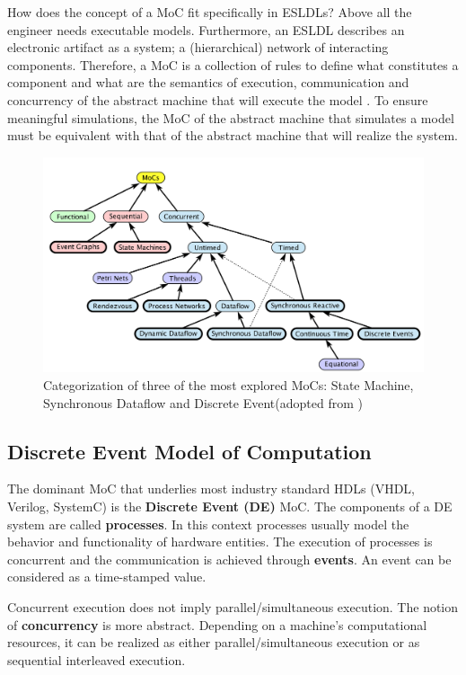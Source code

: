 \documentclass[12pt,twoside]{article}
\begin{document}
How does the concept of a MoC fit specifically in ESLDLs?
Above all the engineer needs executable models.
Furthermore, an ESLDL describes an electronic artifact as a system; a (hierarchical) network of interacting components.
Therefore, a MoC is a collection of rules to define what constitutes a component and what are the semantics of execution, communication and concurrency of the abstract machine that will execute the model \cite{Jantsch2005} \cite{Editor2014}.
To ensure meaningful simulations, the MoC of the abstract machine that simulates a model must be equivalent with that of the abstract machine that will realize the system.

\begin{figure}[htb]
\centering
\includegraphics[scale=.45]{Figures/MoCs.png}
\caption{\label{fig:MoCs}Categorization of three of the most explored MoCs: State Machine, Synchronous Dataflow and Discrete Event(adopted from \cite{Editor2014})}
\end{figure}


\subsection{Discrete Event Model of Computation}
\label{sec-4-2}
The dominant MoC that underlies most industry standard HDLs (VHDL, Verilog, SystemC) is the \textbf{Discrete Event (DE)} MoC.
The components of a DE system are called \textbf{processes}.
In this context processes usually model the behavior and functionality of hardware entities.
The execution of processes is concurrent and the communication is achieved through \textbf{events}.
An event can be considered as a time-stamped value.

Concurrent execution does not imply parallel/simultaneous execution. 
The notion of \textbf{concurrency} is more abstract. 
Depending on a machine's computational resources, it can be realized as either parallel/simultaneous execution or as sequential interleaved execution.
\end{document}
